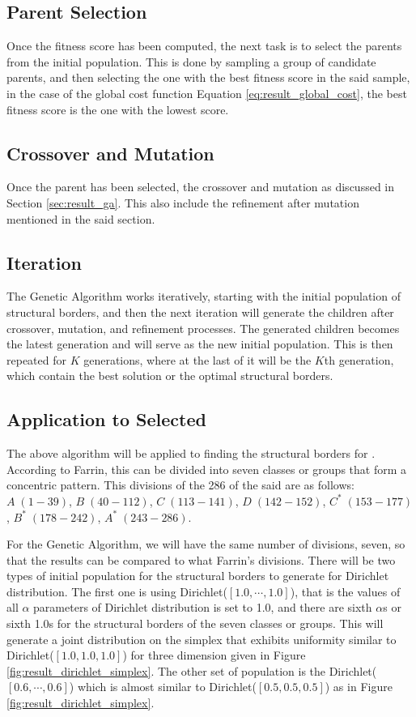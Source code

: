\subsection{Parent Selection}
Once the fitness score has been computed, the next task is to select the parents from the initial population. This is done by sampling a group of candidate parents, and then selecting the one with the best fitness score in the said sample, in the case of the global cost function Equation \ref{eq:result_global_cost}, the best fitness score is the one with the lowest score.
\subsection{Crossover and Mutation}
Once the parent has been selected, the crossover and mutation as discussed in Section \ref{sec:result_ga}. This also include the refinement after mutation mentioned in the said section.
\subsection{Iteration}
The Genetic Algorithm works iteratively, starting with the initial population of structural borders, and then the next iteration will generate the children after crossover, mutation, and refinement processes. The generated children becomes the latest generation and will serve as the new initial population. This is then repeated for $K$ generations, where at the last of it will be the $K$th generation, which contain the best solution or the optimal structural borders.

\subsection{Application to Selected  }
The above algorithm will be applied to finding the structural borders for  . According to Farrin, this   can be divided into seven classes or groups that form a concentric pattern. This divisions of the 286   of the said   are as follows: $A\;(1-39)$, $B\;(40-112)$, $C\;(113-141)$, $D\;(142-152)$, $C^*\;(153-177)$, $B^*\;(178-242)$, $A^*\;(243-286)$. 

For the Genetic Algorithm, we will have the same number of divisions, seven, so that the results can be compared to what Farrin's divisions. There will be two types of initial population for the structural borders to generate for Dirichlet distribution. The first one is using Dirichlet($[1.0,\cdots,1.0]$), that is the values of all $\alpha$ parameters of Dirichlet distribution is set to 1.0, and there are sixth $\alpha$s or sixth 1.0s for the structural borders of the seven classes or groups. This will generate a joint distribution on the simplex that exhibits uniformity similar to Dirichlet($[1.0,1.0,1.0]$) for three dimension given in Figure \ref{fig:result_dirichlet_simplex}. The other set of population is the Dirichlet($[0.6,\cdots,0.6]$) which is almost similar to Dirichlet($[0.5,0.5,0.5]$) as in Figure \ref{fig:result_dirichlet_simplex}. 

